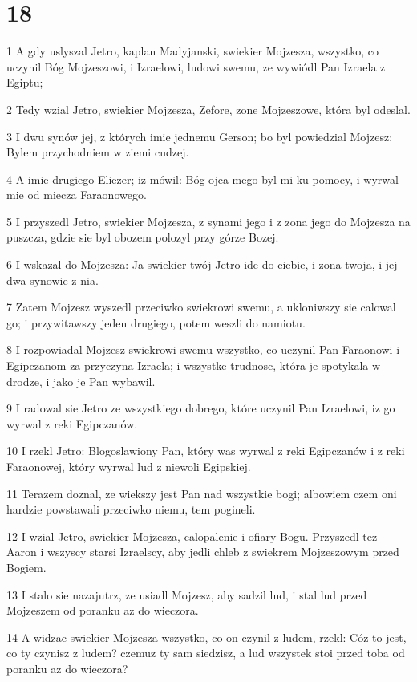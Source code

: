 \chapter{18}

\par 1 A gdy uslyszal Jetro, kaplan Madyjanski, swiekier Mojzesza, wszystko, co uczynil Bóg Mojzeszowi, i Izraelowi, ludowi swemu, ze wywiódl Pan Izraela z Egiptu;
\par 2 Tedy wzial Jetro, swiekier Mojzesza, Zefore, zone Mojzeszowe, która byl odeslal.
\par 3 I dwu synów jej, z których imie jednemu Gerson; bo byl powiedzial Mojzesz: Bylem przychodniem w ziemi cudzej.
\par 4 A imie drugiego Eliezer; iz mówil: Bóg ojca mego byl mi ku pomocy, i wyrwal mie od miecza Faraonowego.
\par 5 I przyszedl Jetro, swiekier Mojzesza, z synami jego i z zona jego do Mojzesza na puszcza, gdzie sie byl obozem polozyl przy górze Bozej.
\par 6 I wskazal do Mojzesza: Ja swiekier twój Jetro ide do ciebie, i zona twoja, i jej dwa synowie z nia.
\par 7 Zatem Mojzesz wyszedl przeciwko swiekrowi swemu, a ukloniwszy sie calowal go; i przywitawszy jeden drugiego, potem weszli do namiotu.
\par 8 I rozpowiadal Mojzesz swiekrowi swemu wszystko, co uczynil Pan Faraonowi i Egipczanom za przyczyna Izraela; i wszystke trudnosc, która je spotykala w drodze, i jako je Pan wybawil.
\par 9 I radowal sie Jetro ze wszystkiego dobrego, które uczynil Pan Izraelowi, iz go wyrwal z reki Egipczanów.
\par 10 I rzekl Jetro: Blogoslawiony Pan, który was wyrwal z reki Egipczanów i z reki Faraonowej, który wyrwal lud z niewoli Egipskiej.
\par 11 Terazem doznal, ze wiekszy jest Pan nad wszystkie bogi; albowiem czem oni hardzie powstawali przeciwko niemu, tem pogineli.
\par 12 I wzial Jetro, swiekier Mojzesza, calopalenie i ofiary Bogu. Przyszedl tez Aaron i wszyscy starsi Izraelscy, aby jedli chleb z swiekrem Mojzeszowym przed Bogiem.
\par 13 I stalo sie nazajutrz, ze usiadl Mojzesz, aby sadzil lud, i stal lud przed Mojzeszem od poranku az do wieczora.
\par 14 A widzac swiekier Mojzesza wszystko, co on czynil z ludem, rzekl: Cóz to jest, co ty czynisz z ludem? czemuz ty sam siedzisz, a lud wszystek stoi przed toba od poranku az do wieczora?
